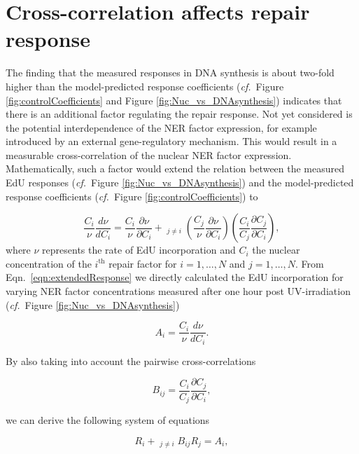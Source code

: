 \section{Cross-correlation affects repair response}
\label{sec:crossCorelResponse}
The finding that the measured responses in DNA synthesis is about two-fold higher than the model-predicted response coefficients (\textit{cf.}\ Figure \ref{fig:controlCoefficients} and Figure \ref{fig:Nuc_vs_DNAsynthesis}) indicates that there is an additional factor regulating the repair response. Not yet considered is the potential interdependence of the NER factor expression, for example introduced by an external gene-regulatory mechanism. This would result in a measurable cross-correlation of the nuclear NER factor expression. Mathematically, such a factor would extend the relation between the measured EdU responses (\textit{cf.}\ Figure \ref{fig:Nuc_vs_DNAsynthesis}) and the model-predicted response coefficients (\textit{cf.}\ Figure \ref{fig:controlCoefficients}) to 

\begin{equation}
\frac{C_i}{\nu}\frac{d \nu}{d C_i} = \frac{C_i}{\nu}\frac{\partial \nu}{\partial C_i} + \mathop{\sum_{j=1}}_{j \neq i} \left( \frac{C_j}{\nu}\frac{\partial \nu}{\partial C_i}\right) \left(\frac{C_i}{C_j}\frac{\partial C_j}{\partial C_i}\right), 
\label{eqn:extendedResponse}
\end{equation}    
where $\nu$ represents the rate of EdU incorporation and $C_i$ the nuclear concentration of the $i^{\text{th}}$ repair factor for $i = 1,\ldots,N$ and $j = 1,\ldots,N$. From Eqn.\ \ref{eqn:extendedResponse} we directly calculated the EdU incorporation for varying NER factor concentrations measured after one hour post UV-irradiation (\textit{cf.}\ Figure \ref{fig:Nuc_vs_DNAsynthesis})

\begin{equation}
A_i = \frac{C_i}{\nu}\frac{d \nu}{d C_i}. \nonumber
\end{equation}

By also taking into account the pairwise cross-correlations

\begin{equation}
B_{ij} = \frac{C_i}{C_j}\frac{\partial C_j}{\partial C_i}, \nonumber
\end{equation}

we can derive the following system of equations


\begin{equation}
R_i + \mathop{\sum_{j = 1}}_{j\neq i} B_{ij}R_j = A_i,
\label{eqn:linearEqnSystem}
\end{equation}

